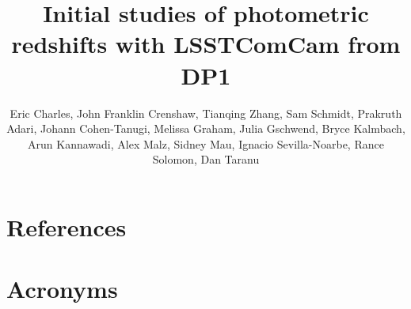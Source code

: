 \documentclass[SE,authoryear,toc]{lsstdoc}
\title{Initial studies of photometric redshifts with LSSTComCam from DP1}
\author{%
  Eric Charles,
  John Franklin Crenshaw,
  Tianqing Zhang, 
  Sam Schmidt,
  Prakruth Adari, 
  Johann Cohen-Tanugi,
  Melissa Graham,
  Julia Gschwend,
  Bryce Kalmbach,
  Arun Kannawadi,
  Alex Malz,
  Sidney Mau,
  Ignacio Sevilla-Noarbe,
  Rance Solomon,
  Dan Taranu
}
\date{\vcsDate}
\begin{document}
\maketitle




\appendix




\section{References} \label{sec:bib}
\renewcommand{\refname}{} %


\section{Acronyms} \label{sec:acronyms}

\end{document}
